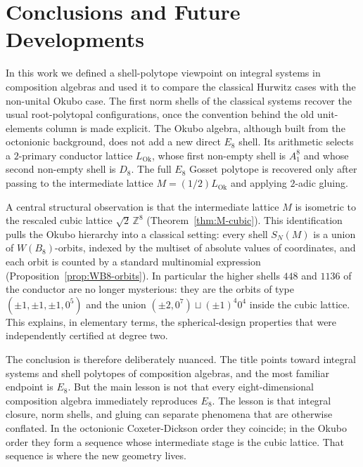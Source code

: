 \documentclass{birkjour}
\newcommand{\LOk}{L_{\mathrm{Ok}}}
\newcommand{\ZZ}{\mathbb Z}
\numberwithin{equation}{section}
\begin{document}
\section{Conclusions and Future Developments}

In this work we defined a shell-polytope viewpoint on integral systems in
composition algebras and used it to compare the classical Hurwitz cases with
the non-unital Okubo case. The first norm shells of the classical systems
recover the usual root-polytopal configurations, once the convention behind
the old unit-elements column is made explicit. The Okubo algebra, although
built from the octonionic background, does not add a new direct \(E_8\) shell.
Its arithmetic selects a \(2\)-primary conductor lattice \(\LOk\), whose first
non-empty shell is \(A_1^8\) and whose second non-empty shell is \(D_8\). The
full \(E_8\) Gosset polytope is recovered only after passing to the
intermediate lattice \(M=(1/2)\LOk\) and applying \(2\)-adic gluing.

A central structural observation is that the intermediate lattice \(M\) is
isometric to the rescaled cubic lattice \(\sqrt2\,\ZZ^8\)
(Theorem~\ref{thm:M-cubic}). This identification pulls the Okubo hierarchy into
a classical setting: every shell \(S_N(M)\) is a union of \(W(B_8)\)-orbits,
indexed by the multiset of absolute values of coordinates, and each orbit is
counted by a standard multinomial expression
(Proposition~\ref{prop:WB8-orbits}). In particular the higher shells \(448\)
and \(1136\) of the conductor are no longer mysterious: they are the orbits of
type \((\pm1,\pm1,\pm1,0^5)\) and the union
\((\pm2,0^7)\sqcup(\pm1)^4 0^4\) inside the cubic lattice. This explains, in
elementary terms, the spherical-design properties that were independently
certified at degree two.

The conclusion is therefore deliberately nuanced. The title points toward
integral systems and shell polytopes of composition algebras, and the most
familiar endpoint is \(E_8\). But the main lesson is not that every
eight-dimensional composition algebra immediately reproduces \(E_8\). The
lesson is that integral closure, norm shells, and gluing can separate phenomena
that are otherwise conflated. In the octonionic Coxeter-Dickson order they
coincide; in the Okubo order they form a sequence whose intermediate stage is
the cubic lattice. That sequence is where the new geometry lives.
\end{document}
